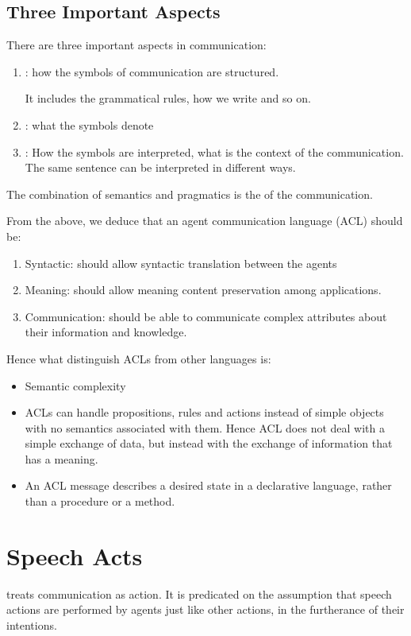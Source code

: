 \subsection{Three Important Aspects}
There are three important aspects in communication:
\begin{enumerate}
\item {}: how the symbols of communication are structured.

It includes the grammatical rules, how we write and so on.
\item {}: what the symbols denote
\item {}: How the symbols are interpreted, what is the context of the communication. The same sentence can be interpreted in different ways.
\end{enumerate} 

The combination of semantics and pragmatics is the  of the communication.

From the above, we deduce that an agent communication language (ACL) should be:
\begin{enumerate}
\item Syntactic: should allow syntactic translation between the agents
\item Meaning: should allow meaning content preservation among applications.
\item Communication: should be able to communicate complex attributes about their information and knowledge.
\end{enumerate}
Hence what distinguish ACLs from other languages is:
\begin{itemize}
\item Semantic complexity
\item ACLs can handle propositions, rules and actions instead of simple objects with no semantics associated with them. Hence ACL does not deal with a simple exchange of data, but instead with the exchange of information that has a meaning.
\item An ACL message describes a desired state in a declarative language, rather than a procedure or a method. 
\end{itemize}


\section{Speech Acts}
\phantom{c} treats communication as action. It is predicated on the assumption that speech actions are performed by agents just like other actions, in the furtherance of their intentions.


